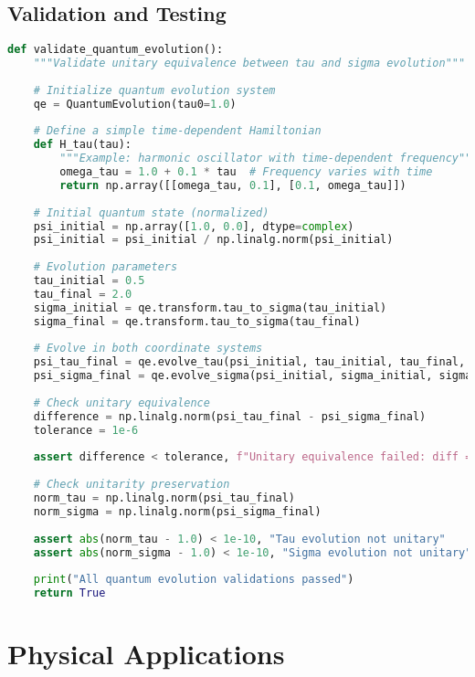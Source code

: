 \documentclass[11pt,a4paper]{article}
\begin{document}
\subsection{Validation and Testing}

\begin{lstlisting}[language=Python, caption=Quantum Evolution Validation]
def validate_quantum_evolution():
    """Validate unitary equivalence between tau and sigma evolution"""
    
    # Initialize quantum evolution system
    qe = QuantumEvolution(tau0=1.0)
    
    # Define a simple time-dependent Hamiltonian
    def H_tau(tau):
        """Example: harmonic oscillator with time-dependent frequency"""
        omega_tau = 1.0 + 0.1 * tau  # Frequency varies with time
        return np.array([[omega_tau, 0.1], [0.1, omega_tau]])
    
    # Initial quantum state (normalized)
    psi_initial = np.array([1.0, 0.0], dtype=complex)
    psi_initial = psi_initial / np.linalg.norm(psi_initial)
    
    # Evolution parameters
    tau_initial = 0.5
    tau_final = 2.0
    sigma_initial = qe.transform.tau_to_sigma(tau_initial)
    sigma_final = qe.transform.tau_to_sigma(tau_final)
    
    # Evolve in both coordinate systems
    psi_tau_final = qe.evolve_tau(psi_initial, tau_initial, tau_final, H_tau)
    psi_sigma_final = qe.evolve_sigma(psi_initial, sigma_initial, sigma_final, H_tau)
    
    # Check unitary equivalence
    difference = np.linalg.norm(psi_tau_final - psi_sigma_final)
    tolerance = 1e-6
    
    assert difference < tolerance, f"Unitary equivalence failed: diff = {difference}"
    
    # Check unitarity preservation
    norm_tau = np.linalg.norm(psi_tau_final)
    norm_sigma = np.linalg.norm(psi_sigma_final)
    
    assert abs(norm_tau - 1.0) < 1e-10, "Tau evolution not unitary"
    assert abs(norm_sigma - 1.0) < 1e-10, "Sigma evolution not unitary"
    
    print("All quantum evolution validations passed")
    return True
\end{lstlisting}

\section{Physical Applications}
\end{document}
